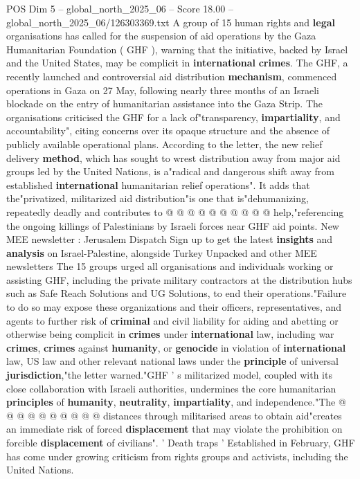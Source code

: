 \begin{textsample}{POS Dim 5 – global\_north\_2025\_06 – Score 18.00 – global\_north\_2025\_06/126303369.txt}  \label{ex:f5_pos_070}
A group of 15 human rights and \textbf{legal} organisations has called for the suspension of aid operations by the Gaza Humanitarian Foundation ( GHF ), warning that the initiative, backed by Israel and the United States, may be complicit in \textbf{international} \textbf{crimes}.
The GHF, a recently launched and controversial aid distribution \textbf{mechanism}, commenced operations in Gaza on 27 May, following nearly three months of an Israeli blockade on the entry of humanitarian assistance into the Gaza Strip.
The organisations criticised the GHF for a lack of"transparency, \textbf{impartiality}, and accountability", citing concerns over its opaque structure and the absence of publicly available operational plans.
According to the letter, the new relief delivery \textbf{method}, which has sought to wrest distribution away from major aid groups led by the United Nations, is a"radical and dangerous shift away from established \textbf{international} humanitarian relief operations".
It adds that the"privatized, militarized aid distribution"is one that is"dehumanizing, repeatedly deadly and contributes to @ @ @ @ @ @ @ @ @ @ help,"referencing the ongoing killings of Palestinians by Israeli forces near GHF aid points.
New MEE newsletter : Jerusalem Dispatch Sign up to get the latest \textbf{insights} and \textbf{analysis} on Israel-Palestine, alongside Turkey Unpacked and other MEE newsletters The 15 groups urged all organisations and individuals working or assisting GHF, including the private military contractors at the distribution hubs such as Safe Reach Solutions and UG Solutions, to end their operations."Failure to do so may expose these organizations and their officers, representatives, and agents to further risk of \textbf{criminal} and civil liability for aiding and abetting or otherwise being complicit in \textbf{crimes} under \textbf{international} law, including war \textbf{crimes}, \textbf{crimes} against \textbf{humanity}, or \textbf{genocide} in violation of \textbf{international} law, US law and other relevant national laws under the \textbf{principle} of universal \textbf{jurisdiction},"the letter warned."GHF ' s militarized model, coupled with its close collaboration with Israeli authorities, undermines the core humanitarian \textbf{principles} of \textbf{humanity}, \textbf{neutrality}, \textbf{impartiality}, and independence."The @ @ @ @ @ @ @ @ @ @ distances through militarised areas to obtain aid"creates an immediate risk of forced \textbf{displacement} that may violate the prohibition on forcible \textbf{displacement} of civilians". ' Death traps ' Established in February, GHF has come under growing criticism from rights groups and activists, including the United Nations.

\end{textsample}
